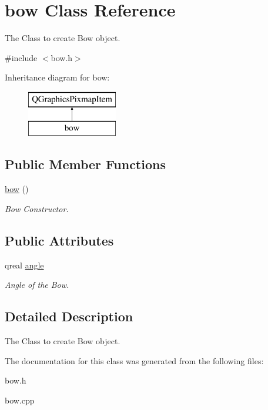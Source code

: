 \hypertarget{classbow}{}\section{bow Class Reference}
\label{classbow}


The Class to create Bow object.  




{\ttfamily \#include $<$bow.\+h$>$}

Inheritance diagram for bow\+:\begin{figure}[H]
\begin{center}
\leavevmode
\includegraphics[height=2.000000cm]{classbow}
\end{center}
\end{figure}
\subsection*{Public Member Functions}
\begin{DoxyCompactItemize}
\item 
\mbox{\label{classbow_a0f2eebc1d7b9c9d6522837c754c109ab}} 
\hyperlink{classbow_a0f2eebc1d7b9c9d6522837c754c109ab}{bow} ()
\begin{DoxyCompactList}\small\item\em Bow Constructor. \end{DoxyCompactList}\end{DoxyCompactItemize}
\subsection*{Public Attributes}
\begin{DoxyCompactItemize}
\item 
\mbox{\label{classbow_afe253300dbd500d2a937acd76af8f2cb}} 
qreal \hyperlink{classbow_afe253300dbd500d2a937acd76af8f2cb}{angle}
\begin{DoxyCompactList}\small\item\em Angle of the Bow. \end{DoxyCompactList}\end{DoxyCompactItemize}


\subsection{Detailed Description}
The Class to create Bow object. 

The documentation for this class was generated from the following files\+:\begin{DoxyCompactItemize}
\item 
bow.\+h\item 
bow.\+cpp\end{DoxyCompactItemize}
